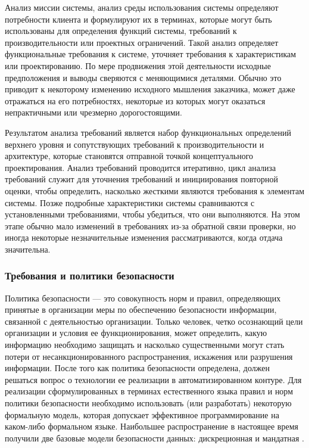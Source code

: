 Анализ миссии системы, анализ среды использования системы определяют потребности клиента и формулируют их в терминах,
которые могут быть использованы для определения функций системы, требований к производительности или проектных
ограничений. Такой анализ определяет функциональные требования к системе, уточняет требования к характеристикам
или проектированию. По мере продвижения этой деятельности исходные предположения и выводы сверяются с меняющимися
деталями. Обычно это приводит к некоторому изменению исходного мышления заказчика, может даже отражаться на его
потребностях, некоторые из которых могут оказаться непрактичными или чрезмерно дорогостоящими.

Результатом анализа требований является набор функциональных определений верхнего уровня и сопутствующих требований
к производительности и архитектуре, которые становятся отправной точкой концептуального проектирования. Анализ
требований проводится итеративно, цикл анализа требований служит для уточнения требований и инициирования
повторной оценки, чтобы определить, насколько жесткими являются требования к элементам системы. Позже подробные
характеристики системы сравниваются с установленными требованиями, чтобы убедиться, что они выполняются.
На этом этапе обычно мало изменений в требованиях из-за обратной связи проверки, но иногда некоторые незначительные
изменения рассматриваются, когда отдача значительна.

\subsubsection{Требования и политики безопасности}

Политика безопасности — это совокупность норм и правил, определяющих принятые в организации меры по обеспечению
безопасности информации, связанной с деятельностью организации. Только человек, четко осознающий цели организации
и условия ее функционирования, может определить, какую информацию необходимо защищать и насколько существенными
могут стать потери от несанкционированного распространения, искажения или разрушения информации. После того как
политика безопасности определена, должен решаться вопрос о технологии ее реализации в автоматизированном контуре.
Для реализации сформулированных в терминах естественного языка правил и норм политики безопасности необходимо
использовать (или разработать) некоторую формальную модель, которая допускает эффективное программирование на
каком-либо формальном языке. Наибольшее распространение в настоящее время получили две базовые модели безопасности
данных: дискреционная и мандатная \autocite{shveikin}.


